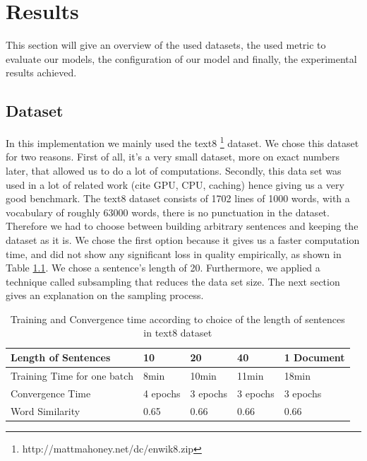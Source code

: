 \chapter{Results}\label{chap:results}



This section will give an overview of the used datasets, the used metric to evaluate our models, the configuration of our model and finally, the experimental results achieved.

\section{Dataset}\label{sec:dataset}
In this implementation we mainly used the text8 \footnote{http://mattmahoney.net/dc/enwik8.zip} dataset. We chose this dataset for two reasons. First of all, it's a very small dataset, more on exact numbers later, that allowed us to do a lot of computations. Secondly, this data set was used in a lot of related work (cite GPU, CPU, caching) hence giving us a very good benchmark. The text8 dataset consists of 1702 lines of 1000 words, with a vocabulary of roughly 63000 words, there is no punctuation in the dataset. Therefore we had to choose between building arbitrary sentences and keeping the dataset as it is. We chose the first option because it gives us a faster computation time, and did not show any significant loss in quality empirically, as shown in Table \ref{table:with_20}. We chose a sentence's length of 20. Furthermore, we applied a technique called subsampling that reduces the data set size. The next section gives an explanation on the sampling process. 

\begin{table}[]
\centering
\begin{tabular}{|l|l|l|l|l|}
\hline
Length of Sentences        &  10  & 20   & 40    & 1 Document \\ \hline
Training Time for one batch  &8min & 10min  &  11min  & 18min      \\ \hline
Convergence Time &4 epochs & 3 epochs & 3 epochs & 3 epochs   \\ \hline
Word Similarity& 0.65  & 0.66 & 0.66    & 0.66       \\ \hline
\end{tabular}
\caption{Training and Convergence time according to choice of the length of sentences in text8 dataset}
    \label{table:with_20}
\end{table}


